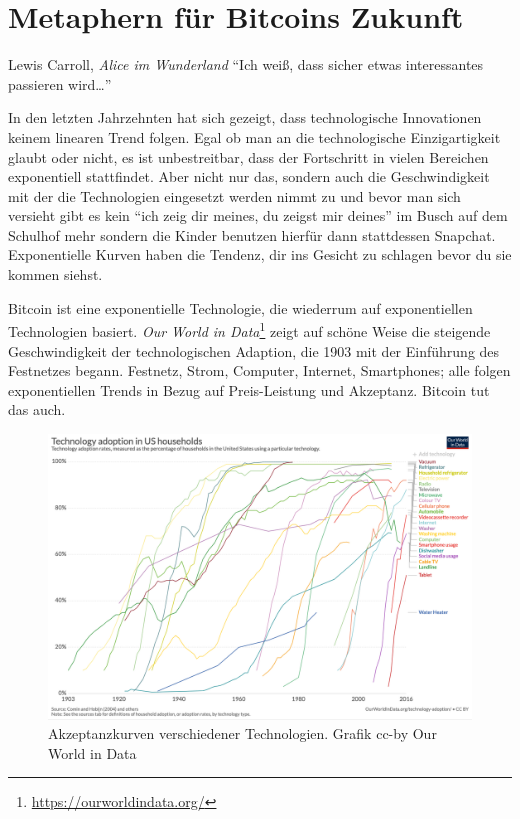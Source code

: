 \chapter{Metaphern für Bitcoins Zukunft}
\label{les:21}

\begin{chapquote}{Lewis Carroll, \textit{Alice im Wunderland}}
\enquote{Ich weiß, dass sicher etwas interessantes passieren wird\ldots}
\end{chapquote}

In den letzten Jahrzehnten hat sich gezeigt, dass technologische Innovationen
keinem linearen Trend folgen. Egal ob man an die technologische Einzigartigkeit
glaubt oder nicht, es ist unbestreitbar, dass der Fortschritt in vielen
Bereichen exponentiell stattfindet. Aber nicht nur das, sondern auch die
Geschwindigkeit mit der die Technologien eingesetzt werden nimmt zu und bevor
man sich versieht gibt es kein \enquote{ich zeig dir meines, du zeigst mir
deines} im Busch auf dem Schulhof mehr sondern die Kinder benutzen hierfür dann
stattdessen Snapchat. Exponentielle Kurven haben die Tendenz, dir ins Gesicht zu
schlagen bevor du sie kommen siehst.

Bitcoin ist eine exponentielle Technologie, die wiederrum auf exponentiellen
Technologien basiert. \textit{Our World in
Data}\footnote{\url{https://ourworldindata.org/}} zeigt auf schöne Weise die
steigende Geschwindigkeit der technologischen Adaption, die 1903 mit der
Einführung des Festnetzes begann. Festnetz, Strom, Computer, Internet,
Smartphones; alle folgen exponentiellen Trends in Bezug auf Preis-Leistung und
Akzeptanz. Bitcoin tut das auch.

\begin{figure}
  \includegraphics{assets/images/tech-adoption.png}
  \caption{Akzeptanzkurven verschiedener Technologien. Grafik cc-by Our World in Data}
  \label{fig:tech-adoption}
\end{figure}

